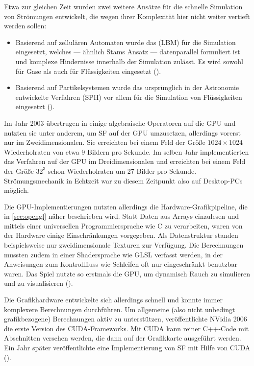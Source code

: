 Etwa zur gleichen Zeit wurden zwei weitere Ansätze für die schnelle
Simulation von Strömungen entwickelt, die wegen ihrer Komplexität hier
nicht weiter vertieft werden sollen:
\begin{itemize}
\item Basierend auf zellulären Automaten wurde das
 (LBM) für die Simulation
eingesetzt, welches --- ähnlich Stams Ansatz --- datenparallel
formuliert ist und komplexe Hindernisse innerhalb der Simulation
zulässt. Es wird sowohl für Gase als auch für Flüssigkeiten
eingesetzt (\cite{Chen1998}).
\item Basierend auf Partikelsystemen wurde das ursprünglich in der
Astronomie entwickelte Verfahren  (SPH) vor allem für die Simulation von Flüssigkeiten
eingesetzt (\cite{Muller2003}).
\end{itemize}
Im Jahr 2003 übertrugen in
\cite{Kruger2005} einige algebraische Operatoren auf die GPU und
nutzten sie unter anderem, um SF auf der GPU umzusetzen, allerdings
vorerst nur im Zweidimensionalen. Sie erreichten bei einem Feld der
Größe $1024 \times 1024$ Wiederholraten von etwa 9 Bildern pro
Sekunde. Im selben Jahr implementierten das Verfahren
auf der GPU im Dreidimensionalen und erreichten bei einem Feld der
Größe $32^3$ schon Wiederholraten um 27 Bilder pro
Sekunde. Strömungsmechanik in Echtzeit war zu diesem Zeitpunkt also
auf Desktop-PCs möglich.

Die GPU-Implementierungen nutzten allerdings die
Hardware-Grafikpipeline, die in \cref{sec:opengl} näher beschrieben
wird. Statt Daten aus Arrays einzulesen und mittels einer universellen
Programmiersprache wie C zu verarbeiten, waren von der Hardware einige
Einschränkungen vorgegeben. Als Datenstruktur standen beispielsweise
nur zweidimensionale Texturen zur Verfügung. Die Berechnungen mussten
zudem in einer Shadersprache wie GLSL verfasst werden, in der
Anweisungen zum Kontrollfluss wie \PimiddyzB{} Schleifen oft nur
eingeschränkt benutzbar waren. Das Spiel  nutzte so erstmals die GPU, um dynamisch Rauch zu simulieren
und zu visualisieren (\cite{Crane2007}).

Die Grafikhardware entwickelte sich allerdings schnell und konnte
immer komplexere Berechnungen durchführen. Um allgemeine (also nicht
unbedingt grafikbezogene) Berechnungen aktiv zu unterstützen,
veröffentlichte NVidia 2006 die erste Version des CUDA-Frameworks. Mit
CUDA kann reiner C++-Code mit Abschnitten versehen werden, die dann
auf der Grafikkarte ausgeführt werden. Ein Jahr später veröffentlichte
 eine Implementierung von SF mit Hilfe von
CUDA (\cite{Goodnight2007}).

